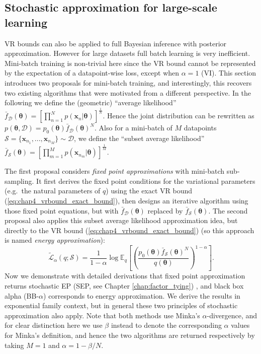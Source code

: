 \subsection{Stochastic approximation for large-scale learning}
\label{sec:chap4_vrbound_large_scale_learning}
VR bounds can also be applied to full Bayesian inference with posterior approximation. However for large datasets full batch learning is very inefficient. Mini-batch training is non-trivial here since the VR bound cannot be represented by the expectation of a datapoint-wise loss, except when $\alpha = 1$ (VI). This section introduces two proposals for mini-batch training, and interestingly, this recovers two existing algorithms that were motivated from a different perspective.
%
In the following we define the (geometric) ``average likelihood'' $\bar{f}_{\mathcal{D}}(\bm{\theta}) = [\prod_{n=1}^N p(\bm{x}_n|\bm{\theta})]^{\frac{1}{N}}$. Hence the joint distribution can be rewritten as $p(\bm{\theta}, \mathcal{D}) = p_0(\bm{\theta}) \bar{f}_{\mathcal{D}}(\bm{\theta})^N$. Also for a mini-batch of $M$ datapoints $\mathcal{S} = \{\bm{x}_{n_1}, ..., \bm{x}_{n_M} \} \sim \mathcal{D}$, we define the ``subset average likelihood'' $\bar{f}_{\mathcal{S}}(\bm{\theta}) = [\prod_{m=1}^M p(\bm{x}_{n_m}|\bm{\theta})]^{\frac{1}{M}}$.

The first proposal considers \emph{fixed point approximations} with mini-batch sub-sampling. It first derives the fixed point conditions for the variational parameters (e.g.~the natural parameters of $q$) using the exact VR bound (\ref{eq:chap4_vrbound_exact_bound}), then designs an iterative algorithm using those fixed point equations, but with $\bar{f}_{\mathcal{D}}(\bm{\theta})$ replaced by $\bar{f}_{\mathcal{S}}(\bm{\theta})$.
%
The second proposal also applies this subset average likelihood approximation idea, but directly to the VR bound (\ref{eq:chap4_vrbound_exact_bound}) (so this approach is named \emph{energy approximation}):
\begin{equation}
\label{eq:alpha_vi_approx}
\tilde{\mathcal{L}}_{\alpha}(q; \mathcal{S}) 
	= \frac{1}{1 - \alpha} \log \mathbb{E}_{q} \left[ \left( \frac{p_0(\bm{\theta}) \bar{f}_{\mathcal{S}}(\bm{\theta})^N} {q(\bm{\theta})} \right)^{1 - \alpha} \right].
\end{equation}
%
Now we demonstrate with detailed derivations that fixed point approximation returns stochastic EP (SEP, see Chapter \ref{chap:factor_tying}) , and black box alpha (BB-$\alpha$) \citep{hernandez-lobato:bbalpha2016} corresponds to energy approximation. We derive the results in exponential family context, but in general these two principles of stochastic approximation also apply. Note that both methods use Minka's $\alpha$-divergence, and for clear distinction here we use $\beta$ instead to denote the corresponding $\alpha$ values for Minka's definition, and hence the two algorithms are returned respectively by taking $M = 1$ and $\alpha = 1 - \beta/N$.


